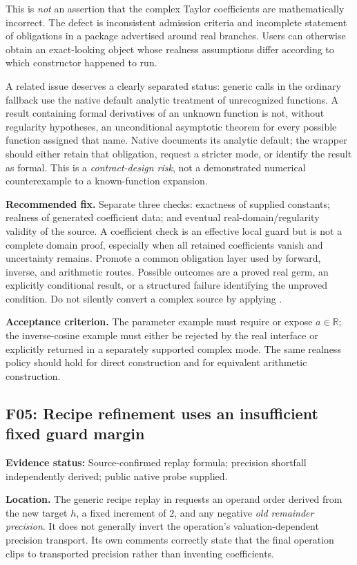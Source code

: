 \documentclass[11pt,a4paper]{article}
\newcommand{\R}{\mathbb R}
\newcommand{\code}[1]{\texttt{\detokenize{#1}}}
\newcommand{\finding}[2]{\subsection{#1: #2}}
\newcommand{\status}[1]{\textbf{Evidence status:} #1.\par}
\begin{document}
This is \emph{not} an assertion that the complex Taylor coefficients are mathematically incorrect. The defect is inconsistent admission criteria and incomplete statement of obligations in a package advertised around real branches. Users can otherwise obtain an exact-looking object whose realness assumptions differ according to which constructor happened to run.

A related issue deserves a clearly separated status: generic \code{Series} calls in the ordinary fallback use the native default analytic treatment of unrecognized functions. A result containing formal derivatives of an unknown function is not, without regularity hypotheses, an unconditional asymptotic theorem for every possible function assigned that name. Native \code{Series} documents its analytic default; the wrapper should either retain that obligation, request a stricter mode, or identify the result as formal. This is a \emph{contract-design risk}, not a demonstrated numerical counterexample to a known-function expansion.\cite{wl-series,core}

\textbf{Recommended fix.} Separate three checks: exactness of supplied constants; realness of generated coefficient data; and eventual real-domain/regularity validity of the source. A coefficient check is an effective local guard but is not a complete domain proof, especially when all retained coefficients vanish and uncertainty remains. Promote a common obligation layer used by forward, inverse, and arithmetic routes. Possible outcomes are a proved real germ, an explicitly conditional result, or a structured failure identifying the unproved condition. Do not silently convert a complex source by applying \code{Re}.

\textbf{Acceptance criterion.} The parameter example must require or expose $a\in\R$; the inverse-cosine example must either be rejected by the real interface or explicitly returned in a separately supported complex mode. The same realness policy should hold for direct construction and for equivalent arithmetic construction.

\finding{F05}{Recipe refinement uses an insufficient fixed guard margin}
\status{Source-confirmed replay formula; precision shortfall independently derived; public native probe supplied}

\textbf{Location.} The generic recipe replay in \code{SeriesRefine} requests an operand order derived from the new target $h$, a fixed increment of 2, and any negative \emph{old remainder precision}. It does not generally invert the operation's valuation-dependent precision transport. Its own comments correctly state that the final operation clips to transported precision rather than inventing coefficients.\cite{ops}
\end{document}
